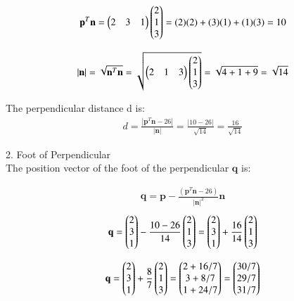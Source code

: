 \documentclass[journal]{IEEEtran}
\begin{document}
\begin{align}
    \textbf{p}^{T} \textbf{n} = \begin{pmatrix} 2 & 3 & 1 \end{pmatrix} \begin{pmatrix} 2 \\ 1 \\ 3 \end{pmatrix} = (2)(2) + (3)(1) + (1)(3) = 10
\end{align}
 

\begin{align}
    |\textbf{n}| = \sqrt{\textbf{n}^T \textbf{n}} = \sqrt{\begin{pmatrix} 2 & 1 & 3 \end{pmatrix} \begin{pmatrix} 2 \\ 1 \\ 3 \end{pmatrix}} = \sqrt{4+1+9} = \sqrt{14}
\end{align}





The perpendicular distance d is:
\begin{align}
    d = \frac{|\textbf{p}^T \textbf{n} - 26|}{|\textbf{n}|} = \frac{|10-26|}{\sqrt{14}} = \frac{16}{\sqrt{14}}
\end{align}


2. Foot of Perpendicular\\

The position vector of the foot of the perpendicular    $\textbf{q}$ is:

\begin{align}
    \textbf{q} = \textbf{p} - \frac{(\textbf{p}^T \textbf{n} - 26)}{|\textbf{n}|^2} \textbf{n}
\end{align}
\begin{align}
  \textbf{q}  = \begin{pmatrix} 2 \\ 3 \\ 1 \end{pmatrix} - \frac{10 - 26}{14} \begin{pmatrix} 2 \\ 1 \\ 3 \end{pmatrix} = \begin{pmatrix} 2 \\ 3 \\ 1 \end{pmatrix} + \frac{16}{14} \begin{pmatrix} 2 \\ 1 \\ 3 \end{pmatrix}
\end{align}


\begin{align}
    \textbf{q} = \begin{pmatrix} 2 \\ 3 \\ 1 \end{pmatrix} + \frac{8}{7} \begin{pmatrix} 2 \\ 1 \\ 3 \end{pmatrix} = \begin{pmatrix} 2 + 16/7 \\ 3 + 8/7 \\ 1 + 24/7 \end{pmatrix} = \begin{pmatrix} 30/7 \\ 29/7 \\ 31/7 \end{pmatrix}
\end{align}
\end{document}
